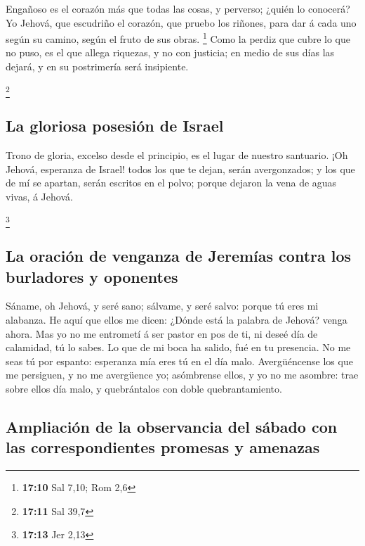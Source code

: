  Engañoso es el corazón más que todas las cosas, y perverso;
¿quién lo conocerá?  Yo Jehová, que escudriño el corazón,
que pruebo los riñones, para dar á cada uno según su camino, según el
fruto de sus obras. \footnote{\textbf{17:10} Sal 7,10; Rom 2,6}
 Como la perdiz que cubre lo que no puso, es el que allega
riquezas, y no con justicia; en medio de sus días las dejará, y en su
postrimería será insipiente.

\footnote{\textbf{17:11} Sal 39,7}

\hypertarget{la-gloriosa-posesiuxf3n-de-israel}{%
\subsection{La gloriosa posesión de
Israel}\label{la-gloriosa-posesiuxf3n-de-israel}}

 Trono de gloria, excelso desde el principio, es el lugar
de nuestro santuario.  ¡Oh Jehová, esperanza de Israel!
todos los que te dejan, serán avergonzados; y los que de mí se apartan,
serán escritos en el polvo; porque dejaron la vena de aguas vivas, á
Jehová.

\footnote{\textbf{17:13} Jer 2,13}

\hypertarget{la-oraciuxf3n-de-venganza-de-jeremuxedas-contra-los-burladores-y-oponentes}{%
\subsection{La oración de venganza de Jeremías contra los burladores y
oponentes}\label{la-oraciuxf3n-de-venganza-de-jeremuxedas-contra-los-burladores-y-oponentes}}

 Sáname, oh Jehová, y seré sano; sálvame, y seré salvo:
porque tú eres mi alabanza.  He aquí que ellos me dicen:
¿Dónde está la palabra de Jehová? venga ahora.  Mas yo no
me entrometí á ser pastor en pos de ti, ni deseé día de calamidad, tú lo
sabes. Lo que de mi boca ha salido, fué en tu presencia. 
No me seas tú por espanto: esperanza mía eres tú en el día malo.
 Avergüéncense los que me persiguen, y no me avergüence yo;
asómbrense ellos, y yo no me asombre: trae sobre ellos día malo, y
quebrántalos con doble quebrantamiento.

\hypertarget{ampliaciuxf3n-de-la-observancia-del-suxe1bado-con-las-correspondientes-promesas-y-amenazas}{%
\subsection{Ampliación de la observancia del sábado con las
correspondientes promesas y
amenazas}\label{ampliaciuxf3n-de-la-observancia-del-suxe1bado-con-las-correspondientes-promesas-y-amenazas}}

